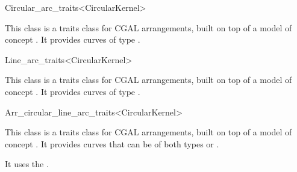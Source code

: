 \begin{ccRefClass}{Circular_arc_traits<CircularKernel>}

\ccDefinition

This class is a traits class for CGAL arrangements, built on top of a model of 
concept .
It provides curves of type .


\ccIsModel
{}

\end{ccRefClass}
\begin{ccRefClass}{Line_arc_traits<CircularKernel>}

\ccDefinition

This class is a traits class for CGAL arrangements, built on top of  a model of 
concept . 
It provides curves of type . 


\ccIsModel
{}

\end{ccRefClass}
\begin{ccRefClass}{Arr_circular_line_arc_traits<CircularKernel>}

\ccDefinition

This class is a traits class for CGAL arrangements, built on top of  a model of 
concept . 
It provides curves that can be of both types 
 or 
.

It uses the . 


\ccIsModel
{}

\end{ccRefClass}
